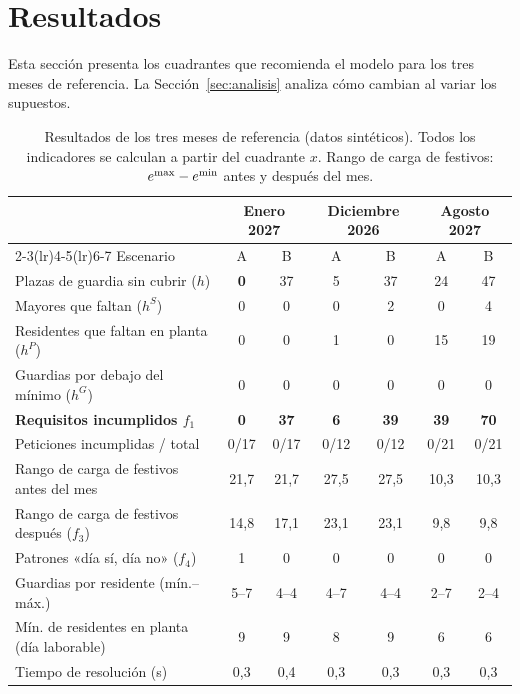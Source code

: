 \section{Resultados}
\label{sec:resultados}

Esta sección presenta los cuadrantes que recomienda el modelo para los tres meses de referencia. La Sección~\ref{sec:analisis} analiza cómo cambian al variar los supuestos.

\begin{table}[ht]
\centering\small
\caption{Resultados de los tres meses de referencia (datos sintéticos). Todos los indicadores se calculan a partir del cuadrante $x$. Rango de carga de festivos: $e^{\protect\max} - e^{\protect\min}$ antes y después del mes.}
\label{tab:base}
\setlength{\tabcolsep}{5pt}
\begin{tabular}{@{}lcccccc@{}}
\toprule
 & \multicolumn{2}{c}{Enero 2027} & \multicolumn{2}{c}{Diciembre 2026} & \multicolumn{2}{c}{Agosto 2027} \\
\cmidrule(lr){2-3}\cmidrule(lr){4-5}\cmidrule(lr){6-7}
Escenario & A & B & A & B & A & B \\
\midrule
Plazas de guardia sin cubrir ($h$)            & \textbf{0} & 37 & 5 & 37 & 24 & 47 \\
Mayores que faltan ($h^S$)                    & 0 & 0 & 0 & 2 & 0 & 4 \\
Residentes que faltan en planta ($h^P$)       & 0 & 0 & 1 & 0 & 15 & 19 \\
Guardias por debajo del mínimo ($h^G$)        & 0 & 0 & 0 & 0 & 0 & 0 \\
\textbf{Requisitos incumplidos $f_1$}         & \textbf{0} & \textbf{37} & \textbf{6} & \textbf{39} & \textbf{39} & \textbf{70} \\
Peticiones incumplidas / total                & 0/17 & 0/17 & 0/12 & 0/12 & 0/21 & 0/21 \\
Rango de carga de festivos antes del mes      & 21,7 & 21,7 & 27,5 & 27,5 & 10,3 & 10,3 \\
Rango de carga de festivos después ($f_3$)    & 14,8 & 17,1 & 23,1 & 23,1 & 9,8 & 9,8 \\
Patrones «día sí, día no» ($f_4$)             & 1 & 0 & 0 & 0 & 0 & 0 \\
Guardias por residente (mín.--máx.)           & 5--7 & 4--4 & 4--7 & 4--4 & 2--7 & 2--4 \\
Mín. de residentes en planta (día laborable)  & 9 & 9 & 8 & 9 & 6 & 6 \\
Tiempo de resolución (s)                      & 0,3 & 0,4 & 0,3 & 0,3 & 0,3 & 0,3 \\
\bottomrule
\end{tabular}
\end{table}

